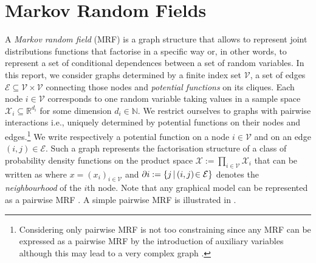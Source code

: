 \section{\label{subsection: mrf}Markov Random Fields}
A \emph{Markov random field} (MRF) is a graph structure that allows to represent joint distributions functions that factorise in a specific way or, in other words, to represent a set of conditional dependences between a set of random variables. In this report, we consider graphs determined by a finite index set $\mathcal V$, a set of edges $\mathcal E\subseteq \mathcal V\times \mathcal V$ connecting those nodes and \emph{potential functions} on its cliques. Each node $i\in\mathcal V$ corresponds to one random variable taking values in a sample space $\mathcal X_i \subseteq\mathbb R^{d_i}$ for some dimension $d_i\in\mathbb N$. We restrict ourselves to graphs with pairwise interactions i.e., uniquely determined by potential functions on their nodes and edges.\footnote{Considering only pairwise MRF is not too constraining since any MRF can be expressed as a pairwise MRF by the introduction of auxiliary variables although this may lead to a very complex graph \citet{wainwright08}.}
We write
%
% 
respectively a potential function on a node $i\in \mathcal V$ and on an edge $(i,j)\in \mathcal E$. 
Such a graph represents the factorisation structure of a class of probability density functions on the product space $\mathcal X := \prod_{i\in \mathcal V}\mathcal X_{i}$ that can be written as
where $x=(x_{i})_{i\in \mathcal V}$ and $\partial i:=\{j\,|\, (i,j)\!\in\,\!\mathcal E\}$ denotes the \emph{neighbourhood} of the $i$th node. Note that any graphical model can be represented as a pairwise MRF \citep{yedidia00}. 
A simple pairwise MRF is illustrated in .\\

